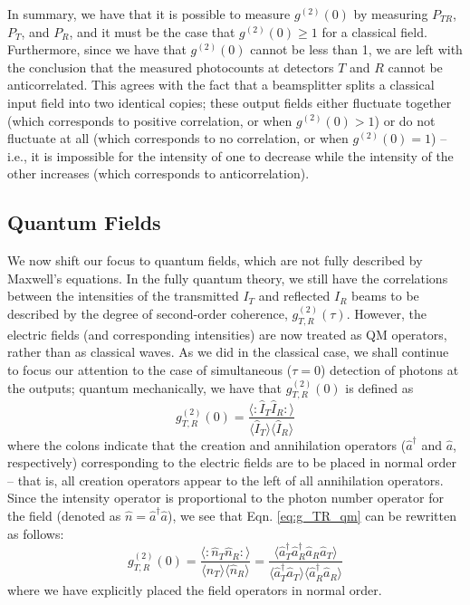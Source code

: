 \documentclass[twocolumn,amsmath,amssymb,pra]{revtex4-2}
\begin{document}
In summary, we have that it is possible to measure $g^{(2)}(0)$ by measuring $P_{TR}$, $P_{T}$, and $P_{R}$, and it must be the case that $g^{(2)}(0) \geq 1$ for a classical field. Furthermore, since we have that $g^{(2)}(0)$ cannot be less than 1, we are left with the conclusion that the measured photocounts at detectors $T$ and $R$ cannot be anticorrelated. This agrees with the fact that a beamsplitter splits a classical input field into two identical copies; these output fields either fluctuate together (which corresponds to positive correlation, or when $g^{(2)}(0) > 1$) or do not fluctuate at all (which corresponds to no correlation, or when $g^{(2)}(0) = 1$) -- i.e., it is impossible for the intensity of one to decrease while the intensity of the other increases (which corresponds to anticorrelation).

\subsection{Quantum Fields}
We now shift our focus to quantum fields, which are not fully described by Maxwell's equations. In the fully quantum theory, we still have the correlations between the intensities of the transmitted $I_{T}$ and reflected $I_{R}$ beams to be described by the degree of second-order coherence, $g_{T, R}^{( 2 )} (\tau)$. However, the electric fields (and corresponding intensities) are now treated as QM operators, rather than as classical waves. As we did in the classical case, we shall continue to focus our attention to the case of simultaneous ($\tau = 0$) detection of photons at the outputs; quantum mechanically, we have that $g_{T, R}^{( 2 )} (0)$ is defined as
\begin{equation}
    g_{T, R}^{( 2 )} (0)
    =
    \frac{ \langle : \hat{I}_{T} \hat{I}_{R} : \rangle }
    { \langle \hat{I}_{T} \rangle \langle\hat{I}_{R} \rangle }
    \label{eq:g_TR_qm}
\end{equation}
where the colons indicate that the creation and annihilation operators ($\hat{a}^{\dagger}$ and $\hat{a}$, respectively) corresponding to the electric fields are to be placed in normal order -- that is, all creation operators appear to the left of all annihilation operators. Since the intensity operator is proportional to the  photon number operator for the field (denoted as $\hat{n} = \hat{a}^{\dagger} \hat{a}$), we see that Eqn. \ref{eq:g_TR_qm} can be rewritten as follows: 
\begin{equation}
    g_{T, R}^{( 2 )} (0)
    =
    \frac{ \langle : \hat{n}_{T} \hat{n}_{R} : \rangle }
    { \langle \hat{n}_{T} \rangle \langle\hat{n}_{R} \rangle }
    =
    \frac{ \langle \hat{a}_{T}^{\dagger} \hat{a}_{R}^{\dagger} \hat{a}_{R} \hat{a}_{T} \rangle }
    { \langle \hat{a}_{T}^{\dagger} \hat{a}_{T} \rangle \langle \hat{a}_{R}^{\dagger} \hat{a}_{R} \rangle }
    \label{eq:g_TR_qm_n}
\end{equation}
where we have explicitly placed the field operators in normal order. 
\end{document}

